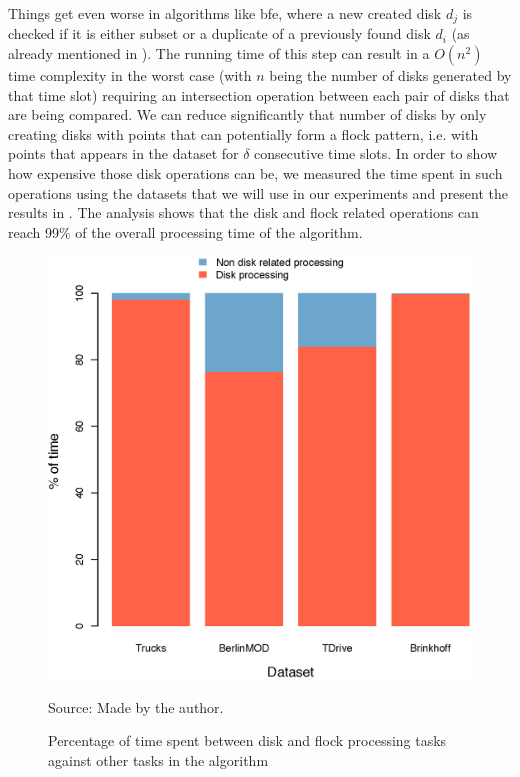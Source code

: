 Things get even worse in algorithms like \ac{bfe}, where a new created disk $d_j$ is checked if it is either subset or a
duplicate of a previously found disk $d_i$ (as already mentioned in ). The running time of
this step can result in a $O(n^2)$ time complexity in the worst case (with $n$ being the number of disks generated by
that time slot) requiring an intersection operation between each pair of disks that are being compared. We can reduce
significantly that number of disks by only creating disks with points that can potentially form a flock pattern, i.e.
with points that appears in the dataset for $\delta$ consecutive time slots. In order to show how expensive those disk
operations can be, we measured the time spent in such operations using the datasets that we will use in our experiments
and present the results in . The analysis shows that the disk and flock related operations
can reach 99\% of the overall processing time of the algorithm.

\begin{figure}[h!]
    \centering
    \caption{Percentage of time spent between disk and flock processing tasks against other tasks in the algorithm}
    \centerline{\includegraphics[width=0.7\linewidth]{images/timeConsumption.eps}}
    \footnotesize{Source: Made by the author.}
    \label{fig:time_consumption}
\end{figure}

